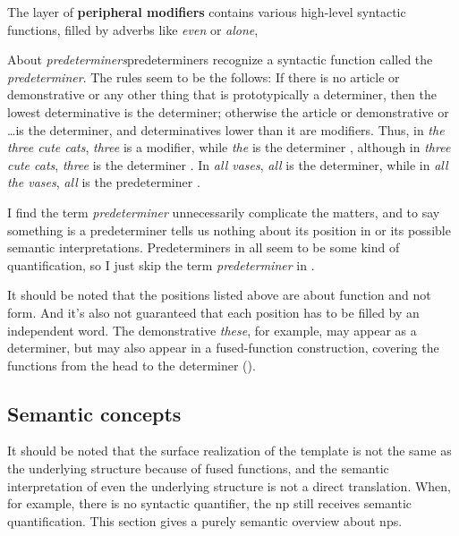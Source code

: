 \documentclass[UTF8, a4paper, oneside, scheme=plain]{ctexrep}
\newcommand*{\citepage}[1]{pp.~{#1}}
\newcommand*{\concept}[1]{\textbf{#1}}
\newcommand*{\term}[1]{\emph{#1}}
\newcommand{\corpus}[1]{\emph{#1}}
\begin{document}
The layer of \concept{peripheral modifiers} contains 
various high-level syntactic functions,
filled by adverbs like \corpus{even} or \corpus{alone},


\begin{infobox}{About \term{predeterminers}}{predeterminers}
    \citet[\citepage{331}]{cgel} recognize a syntactic function called the \term{predeterminer}.
    The rules seem to be the follows: 
    If there is no article or demonstrative or any other thing that is prototypically a determiner,
    then the lowest determinative is the determiner;
    otherwise the article or demonstrative or \dots is the determiner,
    and determinatives lower than it are modifiers.
    Thus, in \corpus{the three cute cats},
    \corpus{three} is a modifier, while \corpus{the} is the determiner 
    \citep[\citepage{356}, {[4ii]}]{cgel},
    although in \corpus{three cute cats}, \corpus{three} is the determiner 
    \citep[\citepage{355}, {[2ii]}]{cgel}.
    In \corpus{all vases}, \corpus{all} is the determiner,
    while in \corpus{all the vases}, \corpus{all} is the predeterminer
    \citep[\citepage{356}, {[4i]}]{cgel}.

    I find the term \term{predeterminer} unnecessarily complicate the matters,
    and to say something is a predeterminer 
    tells us nothing about its position in 
    or its possible semantic interpretations.
    Predeterminers in \citet[\citepage{433}]{cgel}
    all seem to be some kind of quantification,
    so I just skip the term \term{predeterminer} in .
\end{infobox}

It should be noted that the positions listed above are about function and not form.
And it's also not guaranteed that 
each position has to be filled by an independent word.
The demonstrative \corpus{these}, for example, 
may appear as a determiner, 
but may also appear in a fused-function construction,
covering the functions from the head to the determiner
().

\subsection{Semantic concepts}\label{sec:np.semantics}

It should be noted that the surface realization of the template  
is not the same as the underlying structure
because of fused functions,
and the semantic interpretation of even the underlying structure 
is not a direct translation.
When, for example, there is no syntactic quantifier,
the \acs{np} still receives semantic quantification.
This section gives a purely semantic overview about \acs{np}s.
\end{document}
